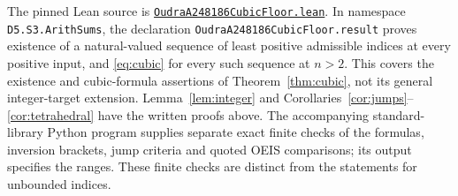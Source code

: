 \documentclass[11pt]{article}
\begin{document}
\begin{sloppypar}
The pinned Lean source is
\href{https://github.com/the-omega-institute/trureturing/blob/f1c20718fca66e9ef0a4cb5f4f6a9a55badd1ab5/D5/S3/ArithSums/OudraA248186CubicFloor.lean}{\texttt{OudraA248186CubicFloor.lean}}.
In namespace \texttt{D5.S3.ArithSums}, the declaration
\texttt{OudraA248186CubicFloor.}\allowbreak\texttt{result}
proves existence of a
natural-valued sequence of least positive admissible indices at every
positive input, and \eqref{eq:cubic} for every such sequence at $n>2$.
This covers the existence and cubic-formula assertions of
Theorem~\ref{thm:cubic}, not its general integer-target extension.
Lemma~\ref{lem:integer} and Corollaries~\ref{cor:jumps}--\ref{cor:tetrahedral}
have the written proofs above. The accompanying standard-library
Python program supplies separate exact finite checks of the formulas,
inversion brackets, jump criteria and quoted OEIS comparisons;
its output specifies the ranges. These finite checks are distinct
from the statements for unbounded indices.
\end{sloppypar}
\end{document}
